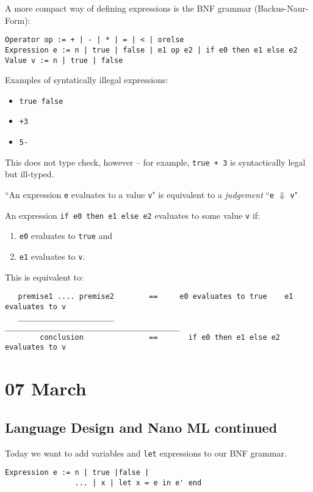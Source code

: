 \documentclass[11pt]{article}
\begin{document}
A more compact way of defining expressions is the BNF grammar (Backus-Naur-Form):
\begin{verbatim}
Operator op := + | - | * | = | < | orelse
Expression e := n | true | false | e1 op e2 | if e0 then e1 else e2
Value v := n | true | false
\end{verbatim}

Examples of syntatically illegal expressions:
\begin{itemize}
    \item \verb~true false~
    \item \verb~+3~
    \item \verb~5-~
\end{itemize}

This does not type check, however -- for example, \verb~true + 3~ is syntactically legal but ill-typed.

``An expression \verb~e~ evaluates to a value \verb~v~" is equivalent to a \emph{judgement} ``\verb~e~ $\Downarrow$ \verb~v~"

An expression \verb~if e0 then e1 else e2~ evaluates to some value \verb~v~ if:
\begin{enumerate}
    \item \verb~e0~ evaluates to \verb~true~ and
    \item \verb~e1~ evaluates to \verb~v~.
\end{enumerate}

This is equivalent to:
\begin{verbatim}
   premise1 .... premise2        ==     e0 evaluates to true    e1 evaluates to v
   ______________________               ________________________________________
        conclusion               ==       if e0 then e1 else e2 evaluates to v
\end{verbatim}

\section{07 March}
\subsection{Language Design and Nano ML continued}

Today we want to add variables and \verb~let~ expressions to our BNF grammar.

\begin{verbatim}
Expression e := n | true |false |
                ... | x | let x = e in e' end
\end{verbatim}
\end{document}
